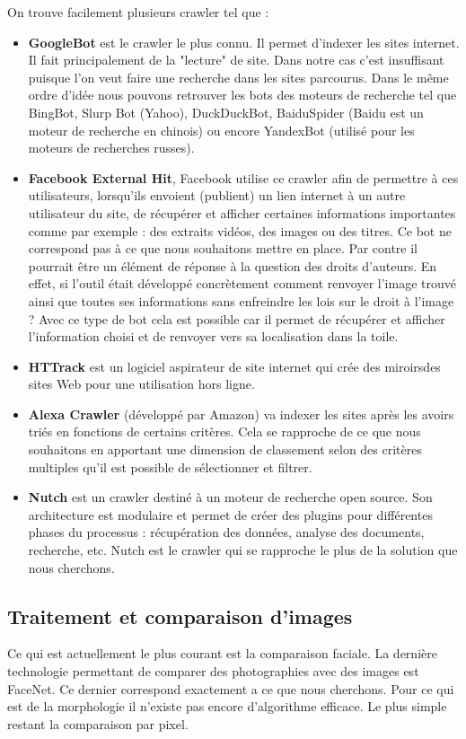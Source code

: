 \documentclass[a4paper,12pt]{article}
\begin{document}
On trouve facilement plusieurs crawler tel que :
\begin{itemize}
    \item \textbf{GoogleBot} est le crawler le plus connu. Il permet d’indexer les sites
internet. Il fait principalement de la "lecture" de site. Dans notre cas c'est insuffisant puisque l'on veut faire une recherche dans les sites parcourus. 
Dans le même ordre d’idée nous pouvons retrouver les bots des moteurs
de recherche tel que BingBot, Slurp Bot (Yahoo), DuckDuckBot,
BaiduSpider (Baidu est un moteur de recherche en chinois) ou encore
YandexBot (utilisé pour les moteurs de recherches russes).
\item \textbf{Facebook External Hit}, Facebook utilise ce crawler afin de permettre
à ces utilisateurs, lorsqu’ils envoient (publient) un lien internet
à un autre utilisateur du site, de récupérer et afficher certaines
informations importantes comme par exemple : des extraits vidéos,
des images ou des titres.
Ce bot ne correspond pas à ce que nous souhaitons mettre en place.
Par contre il pourrait être un élément de réponse à la question des
droits d’auteurs. En effet, si l’outil était développé concrètement comment
renvoyer l’image trouvé ainsi que toutes ses informations sans
enfreindre les lois sur le droit à l’image ? Avec ce type de bot cela est
possible car il permet de récupérer et afficher l’information choisi et
de renvoyer vers sa localisation dans la toile.
\item \textbf{HTTrack} est un logiciel aspirateur de site internet qui crée des miroirsdes sites Web pour une utilisation hors ligne.
\item \textbf{Alexa Crawler} (développé par Amazon) va indexer les sites après
les avoirs triés en fonctions de certains critères. Cela se rapproche de ce que nous souhaitons en apportant une dimension de classement selon des critères multiples qu’il est possible de sélectionner et filtrer.
\item \textbf{Nutch} est un crawler destiné à un moteur de recherche open source.
Son architecture est modulaire et permet de créer des plugins pour différentes phases du processus : récupération des données, analyse des documents, recherche, etc. Nutch est le crawler qui se rapproche le plus de la solution que nous
cherchons.
\end{itemize} 
\subsection{Traitement et comparaison d'images}
Ce qui est actuellement le plus courant est la comparaison faciale. La dernière technologie permettant de comparer des photographies avec des images est FaceNet. Ce dernier correspond exactement a ce que nous cherchons. 
Pour ce qui est de la morphologie il n'existe pas encore d'algorithme efficace. Le plus simple restant la comparaison par pixel. 
\end{document}
